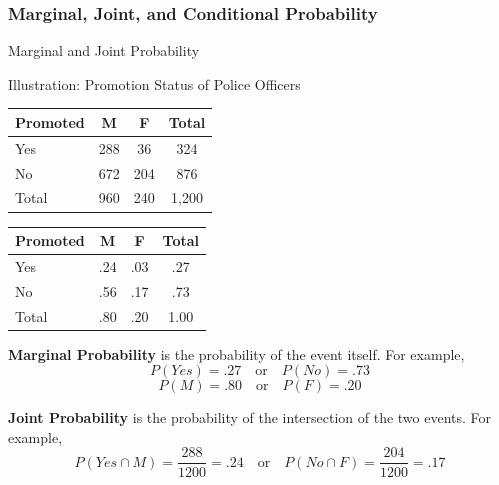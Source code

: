 \documentclass{beamer}
\begin{document}
\subsubsection{Marginal, Joint, and Conditional Probability}
\begin{frame}{Marginal and Joint Probability}

\begin{center}
Illustration: Promotion Status of Police Officers
\end{center}

\begin{multicols}{2}

\begin{small}
\begin{center}
\begin{tabular}{l|c|c|c}
\hline 
Promoted & M & F & Total \\ 
\hline 
Yes & 288 & 36 & 324 \\ 
\hline 
No & 672 & 204 & 876 \\ 
\hline 
Total & 960 & 240 & 1,200 \\ 
\hline 
\end{tabular}
\end{center}



\begin{center}

\begin{tabular}{l|c|c|c}
\hline 
Promoted & M & F & Total \\ 
\hline 
Yes & .24 & .03 & .27 \\ 
\hline 
No & .56 & .17 & .73 \\ 
\hline 
Total & .80 & .20 & 1.00 \\ 
\hline 
\end{tabular}
\end{center}
\end{small}
\end{multicols}

\textbf{Marginal Probability} is the probability of the event itself. For example, 
$$P(Yes) = .27 \quad\text{or}\quad P(No) = .73$$
$$P(M) = .80 \quad\text{or}\quad P(F) = .20$$


\textbf{Joint Probability} is the probability of the intersection of the two events. For example, 
$$ P(Yes \cap M) = \frac{288}{1200} = .24 \quad\text{or}\quad P(No \cap F) = \frac{204}{1200} = .17 $$
$$ $$


\end{frame}
\end{document}
